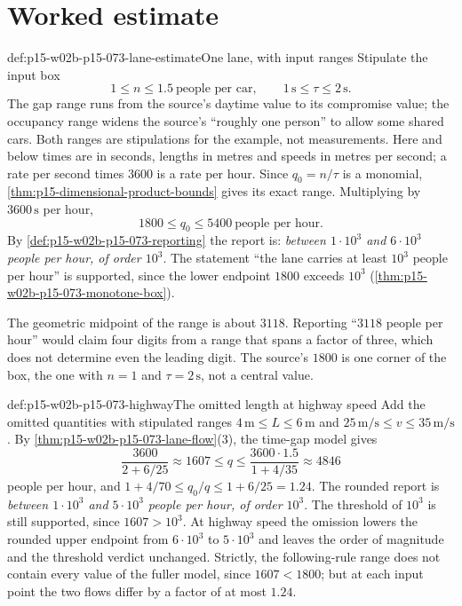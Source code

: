 \section{Worked estimate}
\label{sec:p15-w02b-p15-073-worked}

\begin{hbexample}{def:p15-w02b-p15-073-lane-estimate}{One lane, with input ranges}
Stipulate the input box
\[
 1\leq n\leq1.5\ \text{people per car},\qquad
 1\,\mathrm s\leq\tau\leq2\,\mathrm s .
\]
The gap range runs from the source's daytime value to its compromise value;
the occupancy range widens the source's ``roughly one person'' to allow some
shared cars. Both ranges are stipulations for the example, not measurements.
Here and below times are in seconds, lengths in metres and speeds in metres
per second; a rate per second times \(3600\) is a rate per hour.
Since \(q_0=n/\tau\) is a monomial,
\cref{thm:p15-dimensional-product-bounds} gives its exact range. Multiplying
by \(3600\,\mathrm s\) per hour,
\[
 1800\leq q_0\leq5400\ \text{people per hour}.
\]
By \cref{def:p15-w02b-p15-073-reporting} the report is: \emph{between
\(1\cdot10^3\) and \(6\cdot10^3\) people per hour, of order \(10^3\)}.
The statement ``the lane carries at least \(10^3\) people per hour'' is
supported, since the lower endpoint \(1800\) exceeds \(10^3\)
(\cref{thm:p15-w02b-p15-073-monotone-box}).

The geometric midpoint of the range is about \(3118\). Reporting
``\(3118\) people per hour'' would claim four digits from a range that spans a
factor of three, which does not determine even the leading digit. The source's
\(1800\) is one corner of the box, the one with \(n=1\) and
\(\tau=2\,\mathrm s\), not a central value.
\end{hbexample}

\begin{hbexample}{def:p15-w02b-p15-073-highway}{The omitted length at highway speed}
Add the omitted quantities with stipulated ranges
\(4\,\mathrm m\leq L\leq6\,\mathrm m\) and
\(25\,\mathrm{m/s}\leq v\leq35\,\mathrm{m/s}\).
By \cref{thm:p15-w02b-p15-073-lane-flow}(3), the time-gap model gives
\[
 \frac{3600}{2+6/25}\approx1607\leq q\leq
 \frac{3600\cdot1.5}{1+4/35}\approx4846
\]
people per hour, and \(1+4/70\leq q_0/q\leq1+6/25=1.24\).
The rounded report is \emph{between \(1\cdot10^3\) and \(5\cdot10^3\) people
per hour, of order \(10^3\)}. The threshold of \(10^3\) is still supported,
since \(1607>10^3\). At highway speed the omission lowers the rounded upper
endpoint from \(6\cdot10^3\) to \(5\cdot10^3\) and leaves the order of
magnitude and the threshold verdict unchanged. Strictly, the following-rule
range does not contain every value of the fuller model, since
\(1607<1800\); but at each input point the two flows differ by a factor of
at most \(1.24\).
\end{hbexample}


